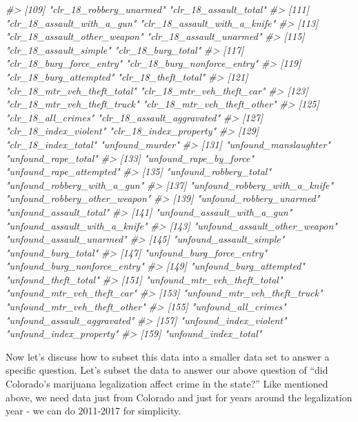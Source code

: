 \documentclass[
  12pt,
]{book}
\newenvironment{Shaded}{\begin{snugshade}}{\end{snugshade}}
\newcommand{\CommentTok}[1]{\textcolor[rgb]{0.37,0.37,0.37}{\textit{#1}}}
\begin{document}
\begin{Shaded}
\begin{Highlighting}[]
\CommentTok{\#> [109] "clr\_18\_robbery\_unarmed"         "clr\_18\_assault\_total"          }
\CommentTok{\#> [111] "clr\_18\_assault\_with\_a\_gun"      "clr\_18\_assault\_with\_a\_knife"   }
\CommentTok{\#> [113] "clr\_18\_assault\_other\_weapon"    "clr\_18\_assault\_unarmed"        }
\CommentTok{\#> [115] "clr\_18\_assault\_simple"          "clr\_18\_burg\_total"             }
\CommentTok{\#> [117] "clr\_18\_burg\_force\_entry"        "clr\_18\_burg\_nonforce\_entry"    }
\CommentTok{\#> [119] "clr\_18\_burg\_attempted"          "clr\_18\_theft\_total"            }
\CommentTok{\#> [121] "clr\_18\_mtr\_veh\_theft\_total"     "clr\_18\_mtr\_veh\_theft\_car"      }
\CommentTok{\#> [123] "clr\_18\_mtr\_veh\_theft\_truck"     "clr\_18\_mtr\_veh\_theft\_other"    }
\CommentTok{\#> [125] "clr\_18\_all\_crimes"              "clr\_18\_assault\_aggravated"     }
\CommentTok{\#> [127] "clr\_18\_index\_violent"           "clr\_18\_index\_property"         }
\CommentTok{\#> [129] "clr\_18\_index\_total"             "unfound\_murder"                }
\CommentTok{\#> [131] "unfound\_manslaughter"           "unfound\_rape\_total"            }
\CommentTok{\#> [133] "unfound\_rape\_by\_force"          "unfound\_rape\_attempted"        }
\CommentTok{\#> [135] "unfound\_robbery\_total"          "unfound\_robbery\_with\_a\_gun"    }
\CommentTok{\#> [137] "unfound\_robbery\_with\_a\_knife"   "unfound\_robbery\_other\_weapon"  }
\CommentTok{\#> [139] "unfound\_robbery\_unarmed"        "unfound\_assault\_total"         }
\CommentTok{\#> [141] "unfound\_assault\_with\_a\_gun"     "unfound\_assault\_with\_a\_knife"  }
\CommentTok{\#> [143] "unfound\_assault\_other\_weapon"   "unfound\_assault\_unarmed"       }
\CommentTok{\#> [145] "unfound\_assault\_simple"         "unfound\_burg\_total"            }
\CommentTok{\#> [147] "unfound\_burg\_force\_entry"       "unfound\_burg\_nonforce\_entry"   }
\CommentTok{\#> [149] "unfound\_burg\_attempted"         "unfound\_theft\_total"           }
\CommentTok{\#> [151] "unfound\_mtr\_veh\_theft\_total"    "unfound\_mtr\_veh\_theft\_car"     }
\CommentTok{\#> [153] "unfound\_mtr\_veh\_theft\_truck"    "unfound\_mtr\_veh\_theft\_other"   }
\CommentTok{\#> [155] "unfound\_all\_crimes"             "unfound\_assault\_aggravated"    }
\CommentTok{\#> [157] "unfound\_index\_violent"          "unfound\_index\_property"        }
\CommentTok{\#> [159] "unfound\_index\_total"}
\end{Highlighting}
\end{Shaded}

Now let's discuss how to subset this data into a smaller data set to answer a specific question. Let's subset the data to answer our above question of ``did Colorado's marijuana legalization affect crime in the state?'' Like mentioned above, we need data just from Colorado and just for years around the legalization year - we can do 2011-2017 for simplicity.
\end{document}

